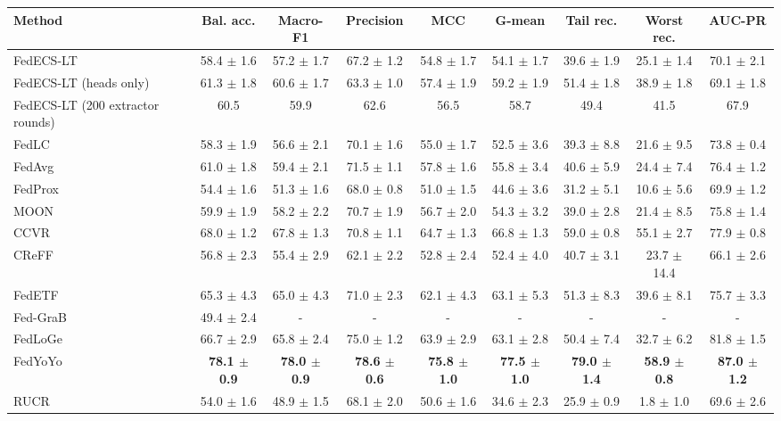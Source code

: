 \begin{tabular}{lcccccccc}
\toprule
Method & Bal. acc. & Macro-F1 & Precision & MCC & G-mean & Tail rec. & Worst rec. & AUC-PR\\
\midrule
FedECS-LT & 58.4 $\pm$ 1.6 & 57.2 $\pm$ 1.7 & 67.2 $\pm$ 1.2 & 54.8 $\pm$ 1.7 & 54.1 $\pm$ 1.7 & 39.6 $\pm$ 1.9 & 25.1 $\pm$ 1.4 & 70.1 $\pm$ 2.1\\
FedECS-LT (heads only) & 61.3 $\pm$ 1.8 & 60.6 $\pm$ 1.7 & 63.3 $\pm$ 1.0 & 57.4 $\pm$ 1.9 & 59.2 $\pm$ 1.9 & 51.4 $\pm$ 1.8 & 38.9 $\pm$ 1.8 & 69.1 $\pm$ 1.8\\
FedECS-LT (200 extractor rounds) & 60.5 & 59.9 & 62.6 & 56.5 & 58.7 & 49.4 & 41.5 & 67.9\\
FedLC & 58.3 $\pm$ 1.9 & 56.6 $\pm$ 2.1 & 70.1 $\pm$ 1.6 & 55.0 $\pm$ 1.7 & 52.5 $\pm$ 3.6 & 39.3 $\pm$ 8.8 & 21.6 $\pm$ 9.5 & 73.8 $\pm$ 0.4\\
FedAvg & 61.0 $\pm$ 1.8 & 59.4 $\pm$ 2.1 & 71.5 $\pm$ 1.1 & 57.8 $\pm$ 1.6 & 55.8 $\pm$ 3.4 & 40.6 $\pm$ 5.9 & 24.4 $\pm$ 7.4 & 76.4 $\pm$ 1.2\\
FedProx & 54.4 $\pm$ 1.6 & 51.3 $\pm$ 1.6 & 68.0 $\pm$ 0.8 & 51.0 $\pm$ 1.5 & 44.6 $\pm$ 3.6 & 31.2 $\pm$ 5.1 & 10.6 $\pm$ 5.6 & 69.9 $\pm$ 1.2\\
MOON & 59.9 $\pm$ 1.9 & 58.2 $\pm$ 2.2 & 70.7 $\pm$ 1.9 & 56.7 $\pm$ 2.0 & 54.3 $\pm$ 3.2 & 39.0 $\pm$ 2.8 & 21.4 $\pm$ 8.5 & 75.8 $\pm$ 1.4\\
CCVR & 68.0 $\pm$ 1.2 & 67.8 $\pm$ 1.3 & 70.8 $\pm$ 1.1 & 64.7 $\pm$ 1.3 & 66.8 $\pm$ 1.3 & 59.0 $\pm$ 0.8 & 55.1 $\pm$ 2.7 & 77.9 $\pm$ 0.8\\
CReFF & 56.8 $\pm$ 2.3 & 55.4 $\pm$ 2.9 & 62.1 $\pm$ 2.2 & 52.8 $\pm$ 2.4 & 52.4 $\pm$ 4.0 & 40.7 $\pm$ 3.1 & 23.7 $\pm$ 14.4 & 66.1 $\pm$ 2.6\\
FedETF & 65.3 $\pm$ 4.3 & 65.0 $\pm$ 4.3 & 71.0 $\pm$ 2.3 & 62.1 $\pm$ 4.3 & 63.1 $\pm$ 5.3 & 51.3 $\pm$ 8.3 & 39.6 $\pm$ 8.1 & 75.7 $\pm$ 3.3\\
Fed-GraB & 49.4 $\pm$ 2.4 & - & - & - & - & - & - & -\\
FedLoGe & 66.7 $\pm$ 2.9 & 65.8 $\pm$ 2.4 & 75.0 $\pm$ 1.2 & 63.9 $\pm$ 2.9 & 63.1 $\pm$ 2.8 & 50.4 $\pm$ 7.4 & 32.7 $\pm$ 6.2 & 81.8 $\pm$ 1.5\\
FedYoYo & \textbf{78.1 $\pm$ 0.9} & \textbf{78.0 $\pm$ 0.9} & \textbf{78.6 $\pm$ 0.6} & \textbf{75.8 $\pm$ 1.0} & \textbf{77.5 $\pm$ 1.0} & \textbf{79.0 $\pm$ 1.4} & \textbf{58.9 $\pm$ 0.8} & \textbf{87.0 $\pm$ 1.2}\\
RUCR & 54.0 $\pm$ 1.6 & 48.9 $\pm$ 1.5 & 68.1 $\pm$ 2.0 & 50.6 $\pm$ 1.6 & 34.6 $\pm$ 2.3 & 25.9 $\pm$ 0.9 & 1.8 $\pm$ 1.0 & 69.6 $\pm$ 2.6\\
\bottomrule
\end{tabular}
